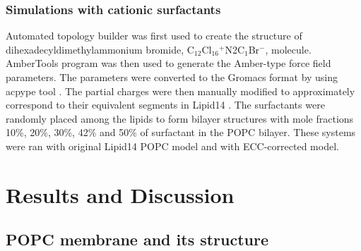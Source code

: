 \documentclass[aip,jcp,twocolumn]{revtex4}
\begin{document}
\subsubsection{Simulations with cationic surfactants}
Automated topology builder \cite{malde11} was first used to create the structure of
dihexadecyldimethylammonium bromide, C$_{12}$Cl$_{16}$$^+$N2C$_1$Br$^-$, molecule.
AmberTools program \cite{amber} was then used to generate the Amber-type force field
parameters. The parameters were converted to the Gromacs format by using
acpype tool \cite{acpype}. The partial charges were then manually modified
to approximately correspond to their equivalent segments in Lipid14 \cite{dickson14}.
The surfactants were randomly placed among the lipids to form bilayer structures with
mole fractions 10\%, 20\%, 30\%, 42\% and 50\% of surfactant in the POPC bilayer.
These systems were ran with original Lipid14 POPC model and with ECC-corrected model.

\section{Results and Discussion}

\subsection{POPC membrane and its structure}
\end{document}
